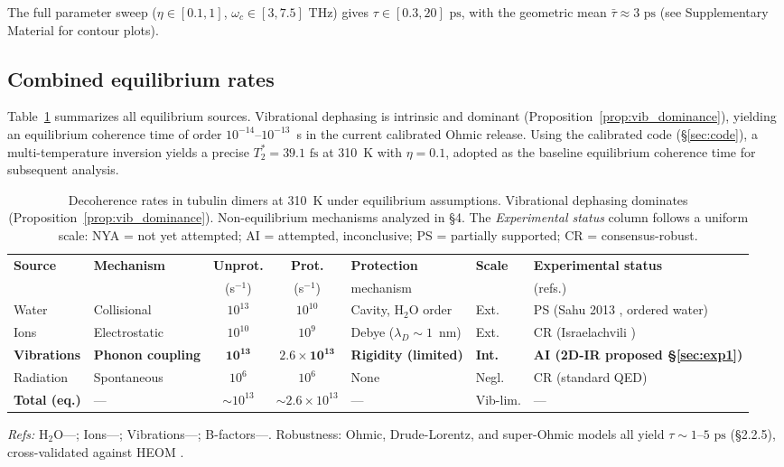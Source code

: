 \documentclass[twocolumn,10pt]{article}
\newcommand{\ps}{\text{~ps}}
\newcommand{\fs}{\text{~fs}}
\newcommand{\THz}{\text{~THz}}
\begin{document}
The full parameter sweep ($\eta \in [0.1,1]$, $\omega_c \in [3,7.5]\THz$)
gives $\tau \in [0.3, 20]\ps$, with the geometric mean
$\bar{\tau} \approx 3\ps$ (see Supplementary Material for contour plots).


\subsection{Combined equilibrium rates}

Table~\ref{tab:decoherence_rates} summarizes all equilibrium sources.
Vibrational dephasing is intrinsic and dominant
(Proposition~\ref{prop:vib_dominance}), yielding an equilibrium coherence
time of order $10^{-14}\text{--}10^{-13}$~s in the current calibrated Ohmic
release. Using the calibrated
code (\S\ref{sec:code}), a multi-temperature inversion yields a precise
$T_2^* = 39.1\fs$ at 310~K with $\eta = 0.1$, adopted as the baseline
equilibrium coherence time for subsequent analysis.

\begin{table}[t]
\centering
\caption{Decoherence rates in tubulin dimers at 310~K under equilibrium
assumptions. Vibrational dephasing dominates
(Proposition~\ref{prop:vib_dominance}). Non-equilibrium mechanisms analyzed
in \S 4. The \emph{Experimental status} column follows a uniform scale:
NYA = not yet attempted; AI = attempted, inconclusive; PS = partially
supported; CR = consensus-robust.}
\label{tab:decoherence_rates}
\footnotesize
\begin{tabular}{p{2.0cm}p{2.2cm}ccp{2.4cm}p{1.5cm}p{3.2cm}}
\toprule
\textbf{Source} & \textbf{Mechanism} & \textbf{Unprot.} & \textbf{Prot.}
& \textbf{Protection} & \textbf{Scale} & \textbf{Experimental status} \\
 & & (s$^{-1}$) & (s$^{-1}$) & mechanism & & (refs.) \\
\midrule
Water & Collisional & $10^{13}$ & $10^{10}$ & Cavity, H$_2$O order & Ext. &
PS (Sahu 2013 \cite{Sahu2013}, ordered water) \\
\addlinespace
Ions & Electrostatic & $10^{10}$ & $10^9$ & Debye ($\lambda_D \sim 1$~nm) &
Ext. & CR (Israelachvili \cite{Israelachvili2011}) \\
\addlinespace
\textbf{Vibrations} & \textbf{Phonon coupling} & $\mathbf{10^{13}}$ &
$\mathbf{2.6\times 10^{13}}$ & \textbf{Rigidity (limited)} &
\textbf{Int.} & \textbf{AI (2D-IR proposed \S\ref{sec:exp1})} \\
\addlinespace
Radiation & Spontaneous & $10^6$ & $10^6$ & None & Negl. & CR (standard QED) \\
\midrule
\textbf{Total (eq.)} & --- & $\sim 10^{13}$ & $\sim 2.6\times 10^{13}$ & --- &
Vib-lim. & --- \\
\bottomrule
\end{tabular}

\vspace{0.2cm}
\footnotesize
\textit{Refs:} H$_2$O---\cite{Eaves2005}; Ions---\cite{Israelachvili2011,Xiang2019};
Vibrations---\cite{May2011,Rego2003,Weiss2008}; B-factors---\cite{Nogales1998}.
Robustness: Ohmic, Drude-Lorentz, and super-Ohmic models all yield
$\tau \sim 1\text{--}5\ps$ (\S 2.2.5), cross-validated against HEOM
\cite{Ishizaki2009}.
\end{table}
\end{document}
